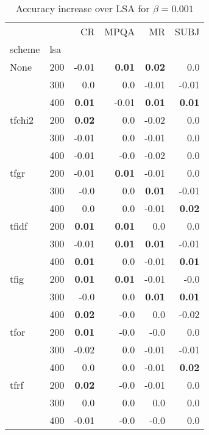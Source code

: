 \begin{table}[h]
\begin{center}

\begin{tabular}{ll|rrrr}
\toprule
   &   &   CR &  MPQA &   MR &  SUBJ \\
scheme & lsa &        &        &        &        \\
\midrule
None & 200 &     -0.01 & \textbf{0.01} & \textbf{0.02} &      0.0 \\
   & 300 &      0.0 &      0.0 &     -0.01 &     -0.01 \\
   & 400 & \textbf{0.01} &     -0.01 & \textbf{0.01} & \textbf{0.01} \\
tfchi2 & 200 & \textbf{0.02} &      0.0 &     -0.02 &      0.0 \\
   & 300 &     -0.01 &      0.0 &     -0.01 &      0.0 \\
   & 400 &     -0.01 &     -0.0 &     -0.02 &      0.0 \\
tfgr & 200 &     -0.01 & \textbf{0.01} &     -0.01 &      0.0 \\
   & 300 &     -0.0 &      0.0 & \textbf{0.01} &     -0.01 \\
   & 400 &      0.0 &      0.0 &     -0.01 & \textbf{0.02} \\
tfidf & 200 & \textbf{0.01} & \textbf{0.01} &      0.0 &      0.0 \\
   & 300 &     -0.01 & \textbf{0.01} & \textbf{0.01} &     -0.01 \\
   & 400 & \textbf{0.01} &      0.0 &     -0.01 & \textbf{0.01} \\
tfig & 200 & \textbf{0.01} & \textbf{0.01} &     -0.01 &     -0.0 \\
   & 300 &     -0.0 &      0.0 & \textbf{0.01} & \textbf{0.01} \\
   & 400 & \textbf{0.02} &     -0.0 &      0.0 &     -0.02 \\
tfor & 200 & \textbf{0.01} &     -0.0 &     -0.0 &      0.0 \\
   & 300 &     -0.02 &      0.0 &     -0.01 &     -0.01 \\
   & 400 &      0.0 &      0.0 &     -0.01 & \textbf{0.02} \\
tfrf & 200 & \textbf{0.02} &     -0.0 &     -0.01 &      0.0 \\
   & 300 &      0.0 &      0.0 &      0.0 &      0.0 \\
   & 400 &     -0.01 &     -0.0 &     -0.0 &      0.0 \\
\bottomrule
\end{tabular}

\caption[Accuracy increase over LSA for $\beta=0.001$]{Accuracy increase over LSA for $\beta=0.001$}
\label{tab:batch:results0.001}
\end{center}
\end{table}






